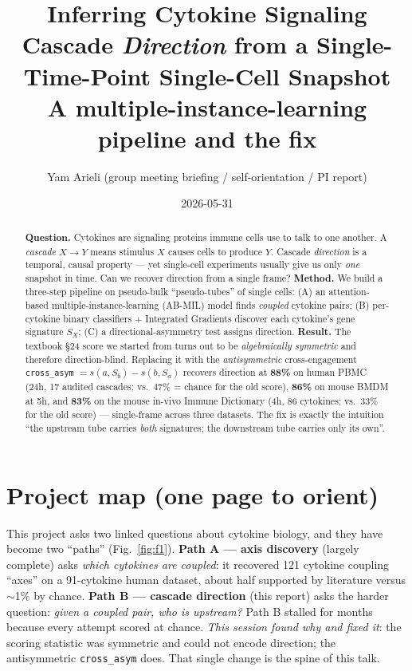 \documentclass[11pt]{article}
\title{\vspace{-1.2cm}\bfseries Inferring Cytokine Signaling Cascade
\emph{Direction} from a Single-Time-Point Single-Cell Snapshot\\[2pt]
\large A multiple-instance-learning pipeline and the \cross{} fix}
\author{Yam Arieli \quad\textnormal{\small(group meeting briefing / self-orientation / PI report)}}
\date{2026-05-31}
\newcommand{\code}[1]{\texttt{\small #1}}
\newcommand{\cross}{\code{cross\_asym}}
\newcommand{\Sx}{\ensuremath{S_X}}
\begin{document}
\maketitle
\vspace{-0.7cm}

\begin{abstract}\noindent
\textbf{Question.} Cytokines are signaling proteins immune cells use to talk to
one another. A \emph{cascade} $X\!\to\!Y$ means stimulus $X$ causes cells to
produce $Y$. Cascade \emph{direction} is a temporal, causal property --- yet
single-cell experiments usually give us only \emph{one} snapshot in time. Can we
recover direction from a single frame? \textbf{Method.} We build a three-step
pipeline on pseudo-bulk ``pseudo-tubes'' of single cells: (A) an attention-based
multiple-instance-learning (AB-MIL) model finds \emph{coupled} cytokine pairs; (B)
per-cytokine binary classifiers + Integrated Gradients discover each cytokine's
gene signature \Sx{}; (C) a directional-asymmetry test assigns direction.
\textbf{Result.} The textbook §24 score we started from turns out to be
\emph{algebraically symmetric} and therefore direction-blind. Replacing it with
the \emph{antisymmetric} cross-engagement \cross{} $= s(a,S_b)-s(b,S_a)$ recovers
direction at \textbf{88\%} on human PBMC (24h, 17 audited cascades; vs.\ 47\% =
chance for the old score), \textbf{86\%} on mouse BMDM at 5h, and \textbf{83\%} on the
mouse in-vivo Immune Dictionary (4h, 86 cytokines; vs.\ 33\% for the old score) ---
single-frame across three datasets. The fix is exactly the intuition
``the upstream tube carries \emph{both} signatures; the downstream tube carries
only its own''.
\end{abstract}

\section{Project map (one page to orient)}\label{sec:map}

This project asks two linked questions about cytokine biology, and they have
become two ``paths'' (Fig.~\ref{fig:f1}). \textbf{Path A --- axis discovery}
(largely complete) asks \emph{which cytokines are coupled}: it recovered 121
cytokine coupling ``axes'' on a 91-cytokine human dataset, about half supported
by literature versus $\sim$1\% by chance. \textbf{Path B --- cascade direction}
(this report) asks the harder question: \emph{given a coupled pair, who is
upstream?} Path B stalled for months because every attempt scored at chance.
\emph{This session found why and fixed it}: the scoring statistic was symmetric
and could not encode direction; the antisymmetric \cross{} does. That single
change is the spine of this talk.
\end{document}

